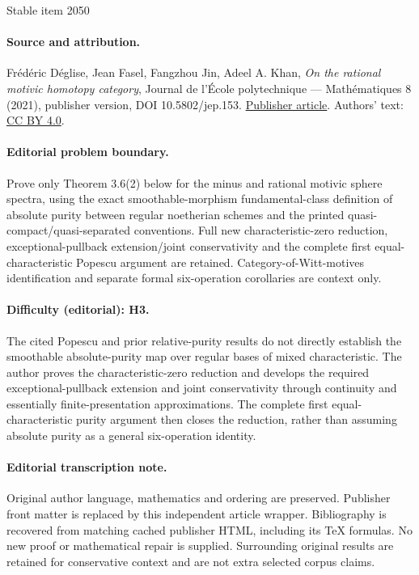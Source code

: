 \documentclass[11pt]{article}
\numberwithin{equation}{section}\renewcommand{\encodingdefault}{TU}
\theoremstyle{remark}
\theoremstyle{definition}
\numberwithin{equation}{thm}
\begin{document}
\begin{center}{\Large Stable item 2050}\end{center}
\paragraph{Source and attribution.}
Frédéric Déglise, Jean Fasel, Fangzhou Jin, Adeel A. Khan, \emph{On the rational motivic homotopy category}, Journal de l’École polytechnique — Mathématiques 8 (2021), publisher version, DOI 10.5802/jep.153. \href{https://jep.centre-mersenne.org/articles/10.5802/jep.153/}{Publisher article}. Authors' text: \href{https://creativecommons.org/licenses/by/4.0/}{CC BY 4.0}.
\paragraph{Editorial problem boundary.}
Prove only Theorem 3.6(2) below for the minus and rational motivic sphere spectra, using the exact smoothable-morphism fundamental-class definition of absolute purity between regular noetherian schemes and the printed quasi-compact/quasi-separated conventions. Full new characteristic-zero reduction, exceptional-pullback extension/joint conservativity and the complete first equal-characteristic Popescu argument are retained. Category-of-Witt-motives identification and separate formal six-operation corollaries are context only.
\paragraph{Difficulty (editorial): H3.}
The cited Popescu and prior relative-purity results do not directly establish the smoothable absolute-purity map over regular bases of mixed characteristic. The author proves the characteristic-zero reduction and develops the required exceptional-pullback extension and joint conservativity through continuity and essentially finite-presentation approximations. The complete first equal-characteristic purity argument then closes the reduction, rather than assuming absolute purity as a general six-operation identity.
\paragraph{Editorial transcription note.}
Original author language, mathematics and ordering are preserved. Publisher front matter is replaced by this independent article wrapper. Bibliography is recovered from matching cached publisher HTML, including its TeX formulas. No new proof or mathematical repair is supplied. Surrounding original results are retained for conservative context and are not extra selected corpus claims.
\clearpage
\end{document}
